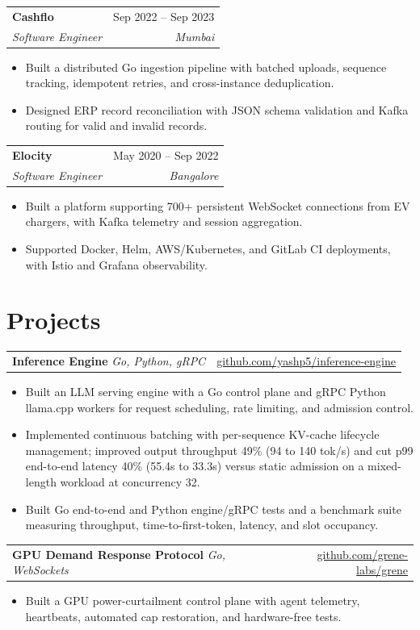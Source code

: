 \documentclass[letterpaper,12pt]{article}
\makeatletter
\newcommand{\entry}[4]{%
  \begin{tabularx}{\textwidth}{@{}X@{}r@{}}
    \textbf{#1} & {\small\color{muted}#2} \\
    {\small\itshape #3} & {\small\itshape\color{muted}#4} \\
  \end{tabularx}\vspace{3pt}
}
\newcommand{\project}[3]{%
  \begin{tabularx}{\textwidth}{@{}X@{}r@{}}
    \textbf{#1}\; {\small\color{muted}\itshape #2} & {\small #3} \\
  \end{tabularx}\vspace{3.5pt}
}
\newenvironment{bullets}
  {\begin{itemize}[leftmargin=1.1em, itemsep=0pt, topsep=0pt, parsep=0pt, label={\color{muted}\footnotesize\textbullet}]\fontsize{11}{13.0}\selectfont}
  {\end{itemize}\vspace{-3pt}}
\makeatother
\begin{document}
\vspace{7pt}
\entry{Cashflo}{Sep 2022 -- Sep 2023}{Software Engineer}{Mumbai}
\begin{bullets}
  \item Built a distributed Go ingestion pipeline with batched uploads, sequence tracking, idempotent retries, and cross-instance deduplication.
  \item Designed ERP record reconciliation with JSON schema validation and Kafka routing for valid and invalid records.
\end{bullets}

\vspace{7pt}
\entry{Elocity}{May 2020 -- Sep 2022}{Software Engineer}{Bangalore}
\begin{bullets}
  \item Built a platform supporting 700+ persistent WebSocket connections from EV chargers, with Kafka telemetry and session aggregation.
  \item Supported Docker, Helm, AWS/Kubernetes, and GitLab CI deployments, with Istio and Grafana observability.
\end{bullets}

\section{Projects}

\project{Inference Engine}{Go, Python, gRPC}{\href{https://github.com/yashp5/inference-engine}{github.com/yashp5/inference-engine}}
\begin{bullets}
  \item Built an LLM serving engine with a Go control plane and gRPC Python llama.cpp workers for request scheduling, rate limiting, and admission control.
  \item Implemented continuous batching with per-sequence KV-cache lifecycle management; improved output throughput 49\% (94 to 140 tok/s) and cut p99 end-to-end latency 40\% (55.4s to 33.3s) versus static admission on a mixed-length workload at concurrency 32.
  \item Built Go end-to-end and Python engine/gRPC tests and a benchmark suite measuring throughput, time-to-first-token, latency, and slot occupancy.
\end{bullets}

\vspace{6pt}
\project{GPU Demand Response Protocol}{Go, WebSockets}{\href{https://github.com/grene-labs/grene}{github.com/grene-labs/grene}}
\begin{bullets}
  \item Built a GPU power-curtailment control plane with agent telemetry, heartbeats, automated cap restoration, and hardware-free tests.
\end{bullets}
\end{document}
